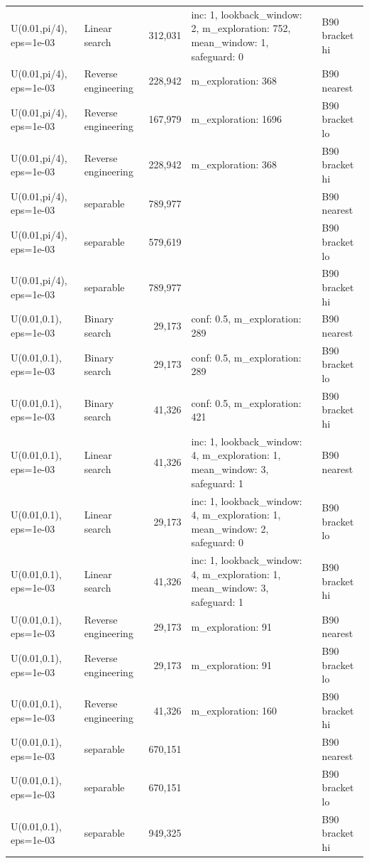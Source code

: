 \begin{tabular}{llrll}
U(0.01,pi/4), eps=1e-03 & Linear search & 312,031 & inc: 1, lookback\_window: 2, m\_exploration: 752, mean\_window: 1, safeguard: 0 & B90 bracket hi \\
U(0.01,pi/4), eps=1e-03 & Reverse engineering & 228,942 & m\_exploration: 368 & B90 nearest \\
U(0.01,pi/4), eps=1e-03 & Reverse engineering & 167,979 & m\_exploration: 1696 & B90 bracket lo \\
U(0.01,pi/4), eps=1e-03 & Reverse engineering & 228,942 & m\_exploration: 368 & B90 bracket hi \\
U(0.01,pi/4), eps=1e-03 & separable & 789,977 &  & B90 nearest \\
U(0.01,pi/4), eps=1e-03 & separable & 579,619 &  & B90 bracket lo \\
U(0.01,pi/4), eps=1e-03 & separable & 789,977 &  & B90 bracket hi \\
U(0.01,0.1), eps=1e-03 & Binary search & 29,173 & conf: 0.5, m\_exploration: 289 & B90 nearest \\
U(0.01,0.1), eps=1e-03 & Binary search & 29,173 & conf: 0.5, m\_exploration: 289 & B90 bracket lo \\
U(0.01,0.1), eps=1e-03 & Binary search & 41,326 & conf: 0.5, m\_exploration: 421 & B90 bracket hi \\
U(0.01,0.1), eps=1e-03 & Linear search & 41,326 & inc: 1, lookback\_window: 4, m\_exploration: 1, mean\_window: 3, safeguard: 1 & B90 nearest \\
U(0.01,0.1), eps=1e-03 & Linear search & 29,173 & inc: 1, lookback\_window: 4, m\_exploration: 1, mean\_window: 2, safeguard: 0 & B90 bracket lo \\
U(0.01,0.1), eps=1e-03 & Linear search & 41,326 & inc: 1, lookback\_window: 4, m\_exploration: 1, mean\_window: 3, safeguard: 1 & B90 bracket hi \\
U(0.01,0.1), eps=1e-03 & Reverse engineering & 29,173 & m\_exploration: 91 & B90 nearest \\
U(0.01,0.1), eps=1e-03 & Reverse engineering & 29,173 & m\_exploration: 91 & B90 bracket lo \\
U(0.01,0.1), eps=1e-03 & Reverse engineering & 41,326 & m\_exploration: 160 & B90 bracket hi \\
U(0.01,0.1), eps=1e-03 & separable & 670,151 &  & B90 nearest \\
U(0.01,0.1), eps=1e-03 & separable & 670,151 &  & B90 bracket lo \\
U(0.01,0.1), eps=1e-03 & separable & 949,325 &  & B90 bracket hi \\

\end{tabular}
